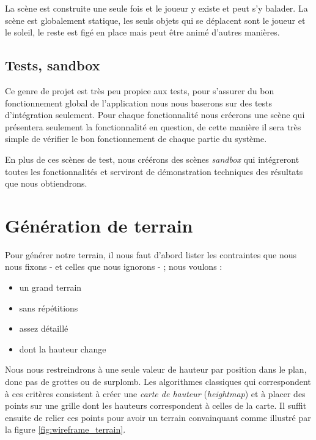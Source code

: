 \documentclass[11pt]{article} %
\begin{document}

La scène est construite une seule fois et le joueur y existe et peut s'y balader. La scène est globalement statique, les seuls objets qui se déplacent sont le joueur et le soleil, le reste est figé en place mais peut être animé d'autres manières.

\subsection{Tests, sandbox}

Ce genre de projet est très peu propice aux tests, pour s'assurer du bon fonctionnement global de l'application nous nous baserons sur des tests d'intégration seulement. Pour chaque fonctionnalité nous créerons une scène qui présentera seulement la fonctionnalité en question, de cette manière il sera très simple de vérifier le bon fonctionnement de chaque partie du système.

En plus de ces scènes de test, nous créérons des scènes \textit{sandbox} qui intégreront toutes les fonctionnalités et serviront de démonstration techniques des résultats que nous obtiendrons.


\section{Génération de terrain}

Pour générer notre terrain, il nous faut d'abord lister les contraintes que nous nous fixons - et celles que nous ignorons - ; nous voulons :
\begin{itemize}
	\item{un grand terrain}
	\item{sans répétitions}
	\item{assez détaillé}
	\item{dont la hauteur change}
\end{itemize}

Nous nous restreindrons à une seule valeur de hauteur par position dans le plan, donc pas de grottes ou de surplomb. Les algorithmes classiques qui correspondent à ces critères consistent à créer une \textit{carte de hauteur} (\textit{heightmap}) et à placer des points sur une grille dont les hauteurs correspondent à celles de la carte. Il suffit ensuite de relier ces points pour avoir un terrain convainquant comme illustré par la figure \ref{fig:wireframe_terrain}.
\end{document}
